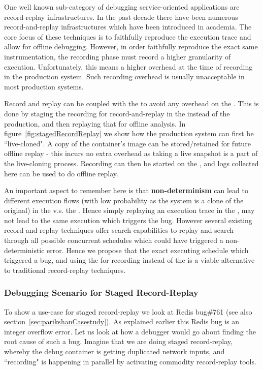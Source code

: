 One well known sub-category of debugging service-oriented applications are record-replay infrastructures.
In the past decade there have been numerous record-and-replay infrastructures which have been introduced in academia.
The core focus of these techniques is to faithfully reproduce the execution trace and allow for offline debugging.
However, in order faithfully reproduce the exact same instrumentation, the recording phase must record a higher granularity of execution.
Unfortunately, this means a higher overhead at the time of recording in the production system.
Such recording overhead is usually unacceptable in most production systems.

Record and replay can be coupled with the \debugcontainer to avoid any overhead on the \productioncontainer.
This is done by staging the recording for record-and-replay in the \debugcontainer instead of the production, and then replaying that for offline analysis.
In figure~\ref{fig:stagedRecordReplay} we show how the production system can first be ``live-cloned". A copy of the container's image can be stored/retained for future offline replay - this incurs no extra overhead as taking a live snapshot is a part of the live-cloning process. Recording can then be started on the \debugcontainer, and logs collected here can be used to do offline replay.

An important aspect to remember here is that \textbf{non-determinism} can lead to different execution flows (with low probability as the system is a clone of the original) in the \debugcontainer v.s. the \productioncontainer.
Hence simply replaying an execution trace in the \debugcontainer, may not lead to the same execution which triggers the bug.
However several existing record-and-replay techniques offer search capabilities to replay and search through all possible concurrent schedules which could have triggered a non-deterministic error.
Hence we propose that the exact executing schedule which triggered a bug, and using the \debugcontainer for recording instead of the \productioncontainer is a viable alternative to traditional record-replay techniques.

\subsubsection{Debugging Scenario for Staged Record-Replay}

To show a use-case for staged record-replay we look at Redis bug\#761 (see also section~\ref{sec:parikshanCasestudy}). 
As explained earlier this Redis bug is an integer overflow error.
Let us look at how a debugger would go about finding the root cause of such a bug.
Imagine that we are doing staged record-replay, whereby the debug container is getting duplicated network inputs, and ``recording" is happening
in parallel by activating commodity record-replay tools.

